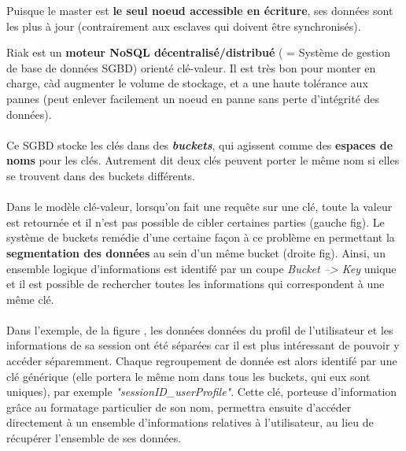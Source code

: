 \item{}
{\vrai}
{Puisque le master est \textbf{le seul noeud accessible en écriture}, ses données sont les plus à jour (contrairement aux esclaves qui doivent être synchronisés).}


\item{}
{\vrai}
{Riak est un \textbf{moteur NoSQL décentralisé/distribué} ( = Système de gestion de base de données SGBD) orienté clé-valeur. Il est très bon pour monter en charge, càd augmenter le volume de stockage, et a une haute tolérance aux pannes (peut enlever facilement un noeud en panne sans perte d'intégrité des données).
\paragraph{}
Ce SGBD stocke les clés dans des \textit{\textbf{buckets}}, qui agissent comme des \textbf{espaces de noms} pour les clés. Autrement dit deux clés peuvent porter le même nom si elles se trouvent dans des buckets différents.
\paragraph{}
Dans le modèle clé-valeur, lorsqu'on fait une requête sur une clé, toute la valeur est retournée et il n'est pas possible de cibler certaines parties (gauche fig\cite{riak-buckets}). Le système de buckets remédie d'une certaine façon à ce problème en permettant la \textbf{segmentation des données} au sein d'un même bucket (droite fig\cite{fig-riak}). Ainsi, un ensemble logique d'informations est identifé par un coupe \textit{Bucket --> Key} unique et il est possible de rechercher toutes les informations qui correspondent à une même clé.
\paragraph{}
Dans l'exemple, de la figure \cite{riak-buckets}, les données données du profil de l'utilisateur et les informations de sa session ont été séparées car il est plus intéressant de pouvoir y accéder séparemment. Chaque regroupement de donnée est alors identifé par une clé générique (elle portera le même nom dans tous les buckets, qui eux sont uniques), par exemple \textit{"sessionID\_userProfile"}. Cette clé, porteuse d'information grâce au formatage particulier de son nom, permettra ensuite d'accéder directement à un ensemble d'informations relatives à l'utilisateur, au lieu de récupérer l'ensemble de ses données.

}
